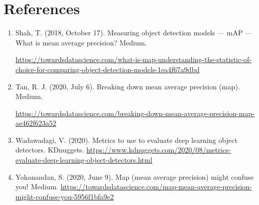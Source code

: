 \documentclass[]{article}
\begin{document}
\section{References}
\begin{enumerate}
	
	\item Shah, T. (2018, October 17). Measuring object detection models — mAP — What is mean average precision? Medium. 
	
	\url{https://towardsdatascience.com/what-is-map-understanding-the-statistic-of-choice-for-comparing-object-detection-models-1ea4f67a9dbd}
	
\item	Tan, R. J. (2020, July 6). Breaking down mean average precision (map). Medium.

 \url{https://towardsdatascience.com/breaking-down-mean-average-precision-map-ae462f623a52}
	
	\item Wadawadagi, V. (2020). Metrics to use to evaluate deep learning object detectors. KDnuggets. \url{https://www.kdnuggets.com/2020/08/metrics-evaluate-deep-learning-object-detectors.html}
	

\item Yohanandan, S. (2020, June 9). Map (mean average precision) might confuse you! Medium. \url{https://towardsdatascience.com/map-mean-average-precision-might-confuse-you-5956f1bfa9e2}

\end{enumerate}
\end{document}
